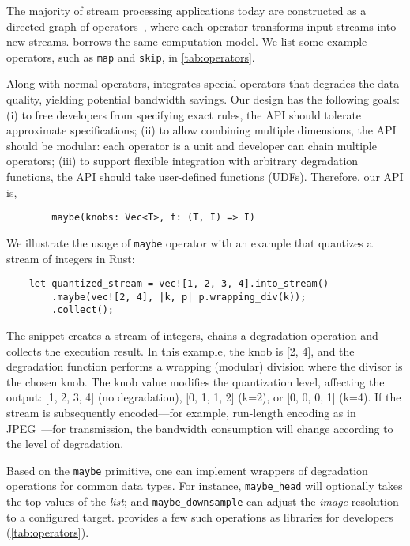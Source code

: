 The majority of stream processing applications today are constructed as a
directed graph of operators~\cite{toshniwal2014storm, zaharia2013discretized},
where each operator transforms input streams into new streams. \sysname{}
borrows the same computation model. We list some example operators, such as
\texttt{map} and \texttt{skip}, in \autoref{tab:operators}.

Along with normal operators, \sysname{} integrates special \maybe{} operators
that degrades the data quality, yielding potential bandwidth savings. Our design
has the following goals: (i) to free developers from specifying exact rules, the
API should tolerate approximate specifications; (ii) to allow combining multiple
dimensions, the API should be modular: each operator is a unit and developer can
chain multiple operators; (iii) to support flexible integration with arbitrary
degradation functions, the API should take user-defined functions
(UDFs). Therefore, our API is,
\vspace{-2pt}
\begin{lstlisting}
        maybe(knobs: Vec<T>, f: (T, I) => I)
\end{lstlisting}

We illustrate the usage of \texttt{maybe} operator with an example that
quantizes a stream of integers in Rust:

\vspace{-2pt}
\begin{lstlisting}
    let quantized_stream = vec![1, 2, 3, 4].into_stream()
        .maybe(vec![2, 4], |k, p| p.wrapping_div(k));
        .collect();
\end{lstlisting}

The snippet creates a stream of integers, chains a degradation operation and
collects the execution result. In this example, the knob is [2, 4], and the
degradation function performs a wrapping (modular) division where the divisor is
the chosen knob. The knob value modifies the quantization level, affecting the
output: [1, 2, 3, 4] (no degradation), [0, 1, 1, 2] (k=2), or [0, 0, 0, 1]
(k=4). If the stream is subsequently encoded---for example, run-length encoding
as in JPEG~\cite{wallace1992jpeg}---for transmission, the bandwidth consumption
will change according to the level of degradation.

Based on the \texttt{maybe} primitive, one can implement wrappers of degradation
operations for common data types. For instance, \texttt{maybe\_head} will
optionally takes the top values of the \textit{list}; and
\texttt{maybe\_downsample} can adjust the \textit{image} resolution to a
configured target. \sysname{} provides a few such operations as libraries for
developers (\autoref{tab:operators}).

